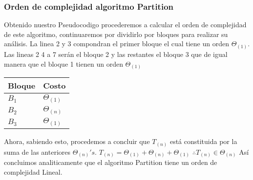 \documentclass[12pt,twoside]{article}
\begin{document}
\subsubsection{Orden de complejidad algoritmo Partition}
Obtenido nuestro Pseudocodigo procederemos a calcular el orden de complejidad de este algoritmo, continuaremos por dividirlo por bloques para realizar su an\'alisis.
La linea 2 y 3 compondran el primer bloque el cual tiene un orden $\Theta_{(1)}$. Las lineas 2 4 a 7 serán el bloque 2 y las restantes el bloque 3 que de igual manera que el bloque 1 tienen un orden $\Theta_{(1)}$
\begin{center}
\begin{tabular}{|l|l|}
\hline
Bloque & Costo\\
\hline
$B_{1}$ &$\Theta_{(1)}$\\
\hline
$B_{2}$ &$\Theta_{(n)}$\\
\hline
$B_{3}$ &$\Theta_{(1)}$\\
\hline
\end{tabular}
\end{center}
Ahora, sabiendo esto, procedemos a concluir que $T_{(n)}$ está constituida por la suma de las anteriores $\Theta_{(n)}'s$.
$T_{(n)}=\Theta_{(1)}+\Theta_{(n)}+\Theta_{(1)}$
$\therefore T_{(n)}\in\Theta_{(n)}$
As\'i concluimos analiticamente que el algoritmo Partition tiene un orden de complejidad Lineal.
\end{document}
